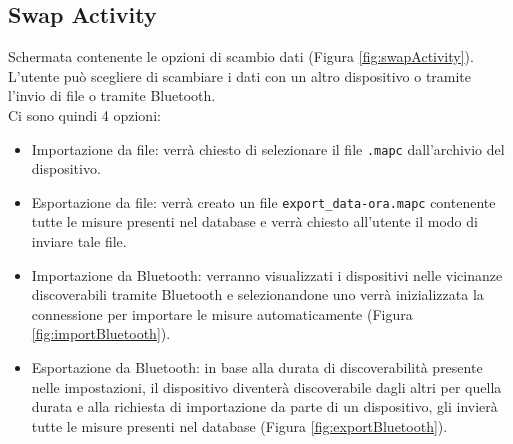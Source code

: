 \documentclass[11pt]{article}
\begin{document}
\subsection{Swap Activity}
\label{sec:swapActivity}
Schermata contenente le opzioni di scambio dati (Figura \ref{fig:swapActivity}). \\
L'utente può scegliere di scambiare i dati con un altro dispositivo o tramite l'invio di file o tramite Bluetooth. \\
Ci sono quindi 4 opzioni:
\begin{itemize}
    \item Importazione da file: verrà chiesto di selezionare il file \texttt{.mapc} dall'archivio del dispositivo.
    \item Esportazione da file: verrà creato un file \texttt{export\_data-ora.mapc} contenente tutte le misure presenti nel database e verrà chiesto all'utente il modo di inviare tale file.
    \item Importazione da Bluetooth: verranno visualizzati i dispositivi nelle vicinanze discoverabili tramite Bluetooth e selezionandone uno verrà inizializzata la connessione per importare le misure automaticamente (Figura \ref{fig:importBluetooth}).
    \item Esportazione da Bluetooth: in base alla durata di discoverabilità presente nelle impostazioni, il dispositivo diventerà discoverabile dagli altri per quella durata e alla richiesta di importazione da parte di un dispositivo, gli invierà tutte le misure presenti nel database (Figura \ref{fig:exportBluetooth}).
\end{itemize}
\end{document}
